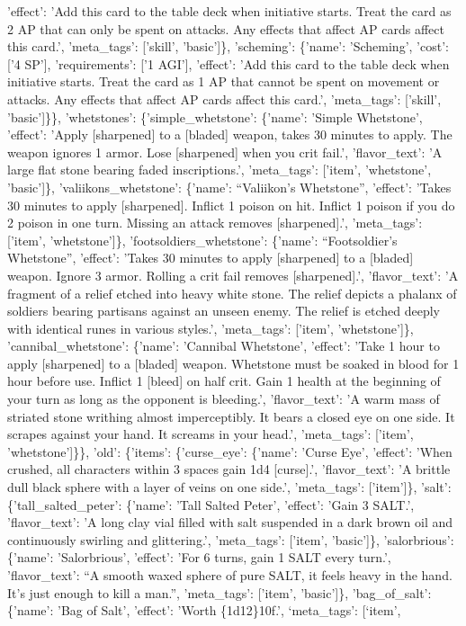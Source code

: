 \documentclass[
  letterpaper,
  DIV=11,
  numbers=noendperiod]{scrartcl}
\begin{document}
{'effect': 'Add this card to the table deck when initiative starts. Treat
the card as 2 AP that can only be spent on attacks. Any effects that
affect AP cards affect this card.', 'meta\_tags': {[}'skill',
'basic'{]}\}, 'scheming': \{'name': 'Scheming', 'cost': {[}'4 SP'{]},
'requirements': {[}'1 AGI'{]}, 'effect': 'Add this card to the table
deck when initiative starts. Treat the card as 1 AP that cannot be spent
on movement or attacks. Any effects that affect AP cards affect this
card.', 'meta\_tags': {[}'skill', 'basic'{]}\}\}, 'whetstones':
\{'simple\_whetstone': \{'name': 'Simple Whetstone', 'effect': 'Apply
{[}sharpened{]} to a {[}bladed{]} weapon, takes 30 minutes to apply. The
weapon ignores 1 armor. Lose {[}sharpened{]} when you crit fail.',
'flavor\_text': 'A large flat stone bearing faded inscriptions.',
'meta\_tags': {[}'item', 'whetstone', 'basic'{]}\},
'valiikons\_whetstone': \{'name': ``Valiikon's Whetstone'', 'effect':
'Takes 30 minutes to apply {[}sharpened{]}. Inflict 1 poison on hit.
Inflict 1 poison if you do 2 poison in one turn. Missing an attack
removes {[}sharpened{]}.', 'meta\_tags': {[}'item', 'whetstone'{]}\},
'footsoldiers\_whetstone': \{'name': ``Footsoldier's Whetstone'',
'effect': 'Takes 30 minutes to apply {[}sharpened{]} to a {[}bladed{]}
weapon. Ignore 3 armor. Rolling a crit fail removes {[}sharpened{]}.',
'flavor\_text': 'A fragment of a relief etched into heavy white stone.
The relief depicts a phalanx of soldiers bearing partisans against an
unseen enemy. The relief is etched deeply with identical runes in
various styles.', 'meta\_tags': {[}'item', 'whetstone'{]}\},
'cannibal\_whetstone': \{'name': 'Cannibal Whetstone', 'effect': 'Take 1
hour to apply {[}sharpened{]} to a {[}bladed{]} weapon. Whetstone must
be soaked in blood for 1 hour before use. Inflict 1 {[}bleed{]} on half
crit. Gain 1 health at the beginning of your turn as long as the
opponent is bleeding.', 'flavor\_text': 'A warm mass of striated stone
writhing almost imperceptibly. It bears a closed eye on one side. It
scrapes against your hand. It screams in your head.', 'meta\_tags':
{[}'item', 'whetstone'{]}\}\}, 'old': \{'items': \{'curse\_eye':
\{'name': 'Curse Eye', 'effect': 'When crushed, all characters within 3
spaces gain 1d4 {[}curse{]}.', 'flavor\_text': 'A brittle dull black
sphere with a layer of veins on one side.', 'meta\_tags':
{[}'item'{]}\}, 'salt': \{'tall\_salted\_peter': \{'name': 'Tall Salted
Peter', 'effect': 'Gain 3 SALT.', 'flavor\_text': 'A long clay vial
filled with salt suspended in a dark brown oil and continuously swirling
and glittering.', 'meta\_tags': {[}'item', 'basic'{]}\}, 'salorbrious':
\{'name': 'Salorbrious', 'effect': 'For 6 turns, gain 1 SALT every
turn.', 'flavor\_text': ``A smooth waxed sphere of pure SALT, it feels
heavy in the hand. It's just enough to kill a man.'', 'meta\_tags':
{[}'item', 'basic'{]}\}, 'bag\_of\_salt': \{'name': 'Bag of Salt',
'effect': 'Worth \{1d12\}}10f.', `meta\_tags': {[}`item',
\end{document}
